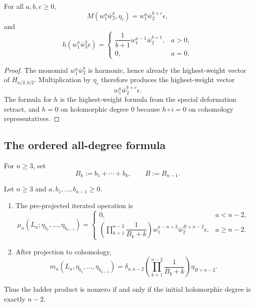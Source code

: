 \begin{lemma}
For all $a,b,c\ge0$,
\[
M(w_1^a\bar w_2^b,\eta_c)=w_1^a\bar w_2^{b+c}\epsilon,
\]
and
\[
h(w_1^a\bar w_2^b\epsilon)=
\begin{cases}
\dfrac{1}{b+1}w_1^{a-1}\bar w_2^{b+1}, & a>0,\\[1ex]
0, & a=0.
\end{cases}
\]
\end{lemma}

\begin{proof}
The monomial $w_1^a\bar w_2^b$ is harmonic, hence already the highest-weight vector of $H_{a/2,b/2}$. Multiplication by $\eta_c$ therefore produces the highest-weight vector
\[
w_1^a\bar w_2^{b+c}\epsilon.
\]
The formula for $h$ is the highest-weight formula from the special deformation retract, and $h=0$ on holomorphic degree $0$ because $h\circ i=0$ on cohomology representatives.
\end{proof}

\subsection{The ordered all-degree formula}

For $n\ge3$, set
\[
B_k:=b_1+\cdots+b_k,
\qquad
B:=B_{n-1}.
\]

\begin{theorem}
Let $n\ge3$ and $a,b_1,\dots,b_{n-1}\ge0$.
\begin{enumerate}[label=\textup{(\roman*)},leftmargin=2em]
\item The pre-projected iterated operation is
\[
\mu_n(L_a;\eta_{b_1},\dots,\eta_{b_{n-1}})
=
\begin{cases}
0, & a<n-2,\\[2ex]
\left(\prod_{k=1}^{n-2}\dfrac{1}{B_k+k}\right)
w_1^{a-n+2}\bar w_2^{B+n-2}\epsilon, & a\ge n-2.
\end{cases}
\]
\item After projection to cohomology,
\[
m_n(L_a,\eta_{b_1},\dots,\eta_{b_{n-1}})
=
\delta_{a,n-2}
\left(\prod_{k=1}^{n-2}\frac{1}{B_k+k}\right)\eta_{B+n-2}.
\]
\end{enumerate}
Thus the ladder product is nonzero if and only if the initial holomorphic degree is exactly $n-2$.
\end{theorem}

